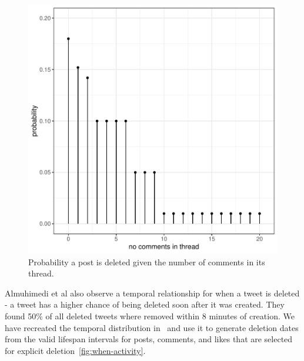 \begin{figure}[H]
  \centering
  \includegraphics[scale=\yedscale]{figures/fig-if-post}
  \caption{Probability a post is deleted given the number of comments in its thread.}
  \label{fig:if-post}
\end{figure}

Almuhimedi et al also observe a temporal relationship for when a tweet is deleted - a tweet has a higher chance of being deleted soon
after it was created.
They found 50\% of all deleted tweets where removed within 8 minutes of creation.
We have recreated the temporal distribution in~\cite{DBLP:conf/cscw/AlmuhimediWLSA13} and use it to generate deletion dates from
the valid lifespan intervals for posts, comments, and likes that are selected for explicit deletion~\autoref{fig:when-activity}.

